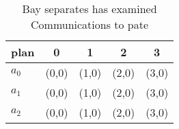 \documentclass[a4paper]{article}
\begin{document}
\begin{table}
\begin{adjustbox}{width=0.6\columnwidth}
\begin{tabular}{|l|l|l|l|l|}
\hline
\textbf{plan} & \multicolumn{1}{c|}{\textbf{0}} & \multicolumn{1}{c|}{\textbf{1}} & \multicolumn{1}{c|}{\textbf{2}} & \multicolumn{1}{c|}{\textbf{3}} \\ \hline
\textbf{$a_0$}  & (0,0) & (1,0) & (2,0) & (3,0) \\ \hline
\textbf{$a_1$}  & (0,0) & (1,0) & (2,0) & (3,0) \\ \hline
\textbf{$a_2$}  & (0,0) & (1,0) & (2,0) & (3,0) \\ \hline
\end{tabular}
\end{adjustbox}
\caption{Bay separates has examined Communications to pate
}
\end{table}
\end{document}
